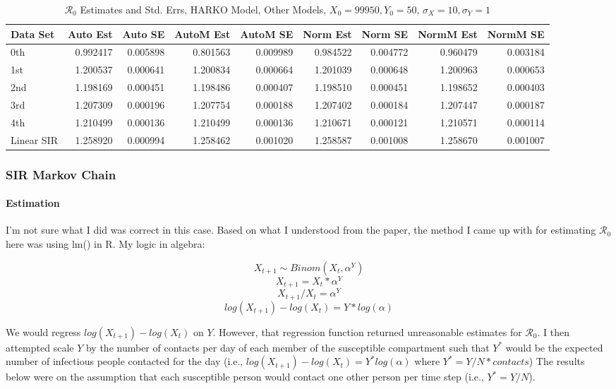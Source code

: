 \documentclass[12pt]{article}
\newcommand{\rr}{\ensuremath{\mathcal{R}_0}}
\begin{document}
\begin{table}[H]
	
	\caption{$\rr$ Estimates and Std. Errs, HARKO Model,
		Other Models, $X_0 = 99950, Y_0 = 50$, 
		$\sigma_X = 10, \sigma_Y = 1$}
	\begin{footnotesize}
		\hskip -1cm
		\begin{tabular}{l|r|r|r|r|r|r|r|r}
			\hline
			Data Set & Auto Est & Auto SE & AutoM Est & AutoM SE & Norm Est & Norm SE & NormM Est & NormM SE\\
			\hline
			0th & 0.992417 & 0.005898 & 0.801563 & 0.009989 & 0.984522 & 0.004772 & 0.960479 & 0.003184\\
			\hline
			1st & 1.200537 & 0.000641 & 1.200834 & 0.000664 & 1.201039 & 0.000648 & 1.200963 & 0.000653\\
			\hline
			2nd & 1.198169 & 0.000451 & 1.198486 & 0.000407 & 1.198510 & 0.000451 & 1.198652 & 0.000403\\
			\hline
			3rd & 1.207309 & 0.000196 & 1.207754 & 0.000188 & 1.207402 & 0.000184 & 1.207447 & 0.000187\\
			\hline
			4th & 1.210499 & 0.000136 & 1.210499 & 0.000136 & 1.210671 & 0.000121 & 1.210571 & 0.000114\\
			\hline
			Linear SIR & 1.258920 & 0.000994 & 1.258462 & 0.001020 & 1.258587 & 0.001008 & 1.258670 & 0.001007\\
			\hline
		\end{tabular}
	\end{footnotesize}
\end{table}

\subsubsection{SIR Markov Chain}

\paragraph{Estimation}

I'm not sure what I did was correct in this case. Based on what I understood from the paper, the method I came up with for estimating $\rr$ here was using lm() in R. My logic in algebra:

$$X_{t+1} \sim Binom(X_{t}, \alpha^Y)$$ $$ X_{t+1} = X_{t} * \alpha^Y$$ $$X _{t+1} / X_{t} = \alpha^Y$$ $$log(X _{t+1}) - log(X_{t}) = Y * log(\alpha)$$

We would regress $log(X _{t+1}) - log(X_{t})$ on $Y$. However, that regression function returned unreasonable estimates for $\rr$. I then attempted scale $Y$ by the number of contacts per day of each member of the susceptible compartment such that $Y^*$ would be the expected number of infectious people contacted for the day (i.e., $log(X _{t+1}) - log(X_{t}) = Y^* log(\alpha)$ where $Y^* = Y/N * contacts$) The results below were on the assumption that each susceptible person would contact one other person per time step (i.e., $Y^* = Y/N$).
\end{document}
